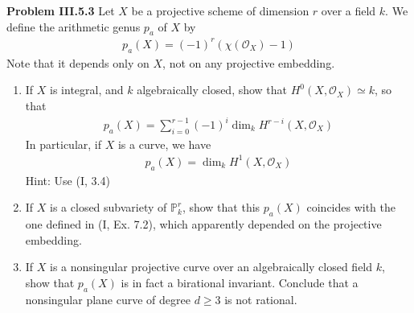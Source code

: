 \documentclass[hidelinks, 12pt]{article}
\theoremstyle{mydefstyle}
\theoremstyle{mythmstyle}
\begin{document}
\textbf{Problem III.5.3} Let $X$ be a projective scheme of dimension $r$ over a field $k$. We define the arithmetic genus $p_a$ of $X$ by
\begin{gather*}
p_a(X) = (-1)^r(\chi(\mathcal{O}_X)-1)
\end{gather*}
Note that it depends only on $X$, not on any projective embedding. 
\begin{enumerate}[(\alph*)]
\item If $X$ is integral, and $k$ algebraically closed, show that $H^0(X, \mathcal{O}_X) \simeq k$, so that
\begin{gather*}
p_a(X) = \sum_{i=0}^{r-1} (-1)^i \dim_k H^{r-i}(X, \mathcal{O}_X)
\end{gather*}
In particular, if $X$ is a curve, we have
\begin{gather*}
p_a(X) = \dim_k H^1(X, \mathcal{O}_X)
\end{gather*}
Hint: Use (I, 3.4)
\item If $X$ is a closed subvariety of $\mathbb{P}^r_k$, show that this $p_a(X)$ coincides with the one defined in (I, Ex. 7.2), which apparently depended on the projective embedding. 
\item If $X$ is a nonsingular projective curve over an algebraically closed field $k$, show that $p_a(X)$ is in fact a birational invariant. Conclude that a nonsingular plane curve of degree $d \ge 3$ is not rational. 
\end{enumerate}
\end{document}
